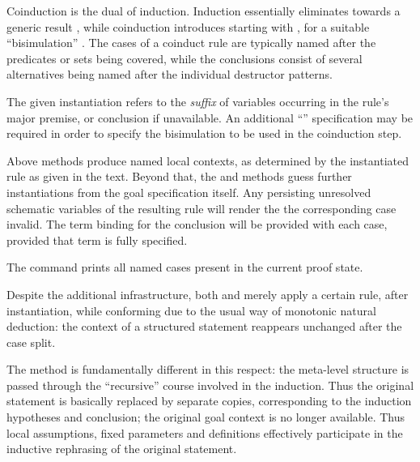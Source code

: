 \begin{isabellebody}
\begin{isamarkuptext}
\begin{descr}
  Coinduction is the dual of induction.  Induction essentially
  eliminates  towards a generic result ,
  while coinduction introduces  starting with , for a suitable ``bisimulation'' .  The cases of a
  coinduct rule are typically named after the predicates or sets being
  covered, while the conclusions consist of several alternatives being
  named after the individual destructor patterns.
  
  The given instantiation refers to the \emph{suffix} of variables
  occurring in the rule's major premise, or conclusion if unavailable.
  An additional ``''
  specification may be required in order to specify the bisimulation
  to be used in the coinduction step.

  \end{descr}

  Above methods produce named local contexts, as determined by the
  instantiated rule as given in the text.  Beyond that, the \mbox{} and \mbox{} methods guess further instantiations
  from the goal specification itself.  Any persisting unresolved
  schematic variables of the resulting rule will render the the
  corresponding case invalid.  The term binding \mbox{} for
  the conclusion will be provided with each case, provided that term
  is fully specified.

  The \mbox{} command prints all named cases present
  in the current proof state.

  \medskip Despite the additional infrastructure, both \mbox{}
  and \mbox{} merely apply a certain rule, after
  instantiation, while conforming due to the usual way of monotonic
  natural deduction: the context of a structured statement 
  reappears unchanged after the case split.

  The \mbox{} method is fundamentally different in this
  respect: the meta-level structure is passed through the
  ``recursive'' course involved in the induction.  Thus the original
  statement is basically replaced by separate copies, corresponding to
  the induction hypotheses and conclusion; the original goal context
  is no longer available.  Thus local assumptions, fixed parameters
  and definitions effectively participate in the inductive rephrasing
  of the original statement.


\end{isamarkuptext}
\end{isabellebody}
